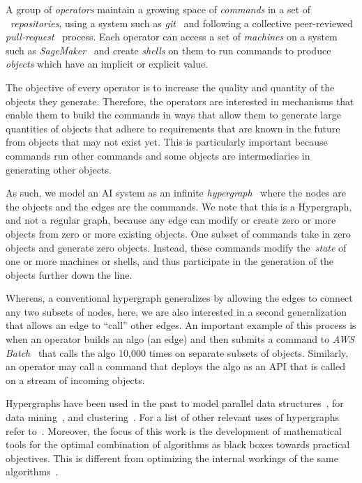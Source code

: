 A group of \emph{operators} maintain a growing space of \emph{commands} in a set of ~\emph{repositories}, using a system such as \emph{git}~\cite{git} and following a collective peer-reviewed \emph{pull-request}~\cite{pull_request} process. Each operator can access a set of \emph{machines} on a system such as \emph{SageMaker}~\cite{sagemaker} and create \emph{shells} on them to run commands to produce \emph{objects} which have an implicit or explicit value.

The objective of every operator is to increase the quality and quantity of the objects they generate. Therefore, the operators are interested in mechanisms that enable them to build the commands in ways that allow them to generate large quantities of objects that adhere to requirements that are known in the future from objects that may not exist yet. This is particularly important because commands run other commands and some objects are intermediaries in generating other objects.

As such, we model an AI system as an infinite \emph{hypergraph}~\cite{Hypergraph13} where the nodes are the objects and the edges are the commands. We note that this is a Hypergraph, and not a regular graph, because any edge can modify or create zero or more objects from zero or more existing objects. One subset of commands take in zero objects and generate zero objects. Instead, these commands modify the~\emph{state} of one or more machines or shells, and thus participate in the generation of the objects further down the line.

Whereas, a conventional hypergraph generalizes by allowing the edges to connect any two subsets of nodes, here, we are also interested in a second generalization that allows an edge to ``call'' other edges. An important example of this process is when an operator builds an algo (an edge) and then submits a command to \emph{AWS Batch}~\cite{aws_batch} that calls the algo 10,000 times on separate subsets of objects. Similarly, an operator may call a command that deploys the algo as an API that is called on a stream of incoming objects.

Hypergraphs have been used in the past to model parallel data structures~\cite{HK00}, for data mining~\cite{HBC07}, and clustering~\cite{BP09}. For a list of other relevant uses of hypergraphs refer to~\cite{Hypergraph13}. Moreover, the focus of this work is the development of mathematical tools for the optimal combination of algorithms as black boxes towards practical objectives. This is different from optimizing the internal workings of the same algorithms~\cite{kutyniok2022,peyre2025}.
